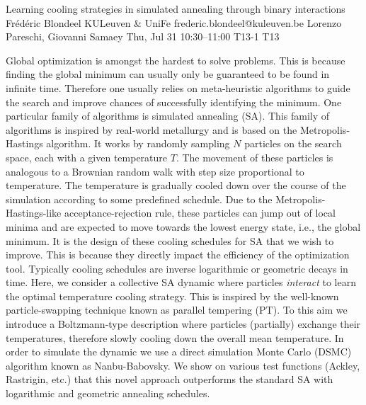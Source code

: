 \begin{talk}
  {Learning cooling strategies in simulated annealing through binary interactions}%
  {Frédéric Blondeel}%
  {KULeuven \& UniFe}%
  {frederic.blondeel@kuleuven.be}%
  {Lorenzo Pareschi, Giovanni Samaey}%
  {}%
  {Thu, Jul 31 10:30–11:00}%
  {T13-1}%
  {T13}%
  
				
			
Global optimization is amongst the hardest to solve problems. This is because finding the global minimum can usually only be guaranteed to be found in infinite time. Therefore one usually relies on meta-heuristic algorithms to guide the search and improve chances of successfully identifying the minimum. One particular family of algorithms is simulated annealing (SA). This family of algorithms is inspired by real-world metallurgy and is based on the Metropolis-Hastings algorithm. It works by randomly sampling $N$ particles on the search space, each with a given temperature $T$. The movement of these particles is analogous to a Brownian random walk with step size proportional to temperature. The temperature is gradually cooled down over the course of the simulation according to some predefined schedule. Due to the Metropolis-Hastings-like acceptance-rejection rule, these particles can jump out of local minima and are expected to move towards the lowest energy state, i.e., the global minimum. It is the design of these cooling schedules for SA that we wish to improve. This is because they directly impact the efficiency of the optimization tool. Typically cooling schedules are inverse logarithmic or geometric decays in time. Here, we consider a collective SA dynamic where particles \textit{interact} to learn the optimal temperature cooling strategy. This is inspired by the well-known particle-swapping technique known as parallel tempering (PT). To this aim we introduce a Boltzmann-type description where particles (partially) exchange their temperatures, therefore slowly cooling down the overall mean temperature. In order to simulate the dynamic we use a direct simulation Monte Carlo (DSMC) algorithm known as Nanbu-Babovsky. We show on various test functions (Ackley, Rastrigin, etc.) that this novel approach outperforms the standard SA with logarithmic and geometric annealing schedules.

\end{talk}

